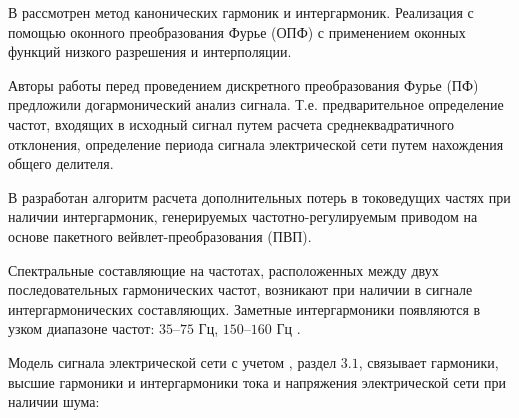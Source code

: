 В \cite{Improving_methods_Shizma_2014} рассмотрен метод канонических гармоник и интергармоник. Реализация с помощью оконного преобразования Фурье (ОПФ) с применением оконных функций низкого разрешения и интерполяции. 


Авторы \cite{Harmonic_analysis_Goldstein2009} работы перед проведением дискретного преобразования Фурье (ПФ) предложили догармонический анализ сигнала. Т.е. предварительное определение частот, входящих в исходный сигнал путем расчета среднеквадратичного отклонения, определение периода сигнала электрической сети путем нахождения общего делителя. 


В \cite{Development_method_Osipov_2017} разработан алгоритм расчета дополнительных потерь в токоведущих частях при наличии интергармоник, генерируемых частотно-регулируемым приводом на основе пакетного вейвлет-преобразования (ПВП).

Спектральные составляющие на частотах, расположенных между двух последовательных гармонических частот, возникают при наличии в сигнале интергармонических составляющих. 
Заметные интергармоники появляются в узком диапазоне частот: $35–75$ Гц, $150–160$ Гц \cite{Interharmonics_in_systems_Zhezhelenko_1999}.
 
Модель сигнала электрической сети с учетом \cite{GOST30804.4.7-2013}, раздел $3.1$, связывает гармоники, высшие гармоники и интергармоники тока и напряжения электрической сети при наличии шума: 

